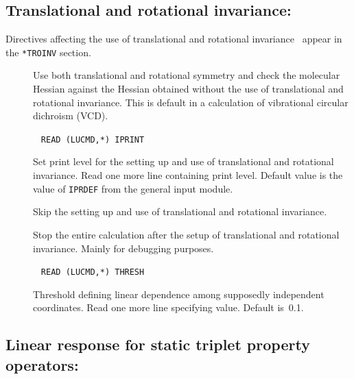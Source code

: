 \subsection{Translational and rotational invariance:
}\label{sec:abatro}

Directives affecting the use of translational and rotational
invariance~\cite{trarot}
appear in the \verb|*TROINV| section.
\begin{description}
\item[] Use both translational and
 rotational symmetry
 and check the molecular Hessian against the Hessian obtained
without the use of translational and rotational invariance. This is
default in a calculation of vibrational circular dichroism
(VCD).

\item[]\verb| |\newline
\verb|READ (LUCMD,*) IPRINT|

Set print level for the setting up and use of translational and
rotational invariance.  Read one more line containing print
level. Default value is the value of \verb|IPRDEF| from the
general input module.

\item[] Skip the setting up and use of translational
and rotational invariance.

\item[] Stop the entire calculation after the setup of
translational and rotational invariance. Mainly for debugging purposes.

\item[]\verb| |\newline
\verb|READ (LUCMD,*) THRESH|

Threshold defining linear dependence among
supposedly independent coordinates.  Read one more line specifying
value.  Default is~0.1.
\end{description}

\subsection{Linear response for static triplet property operators:
}\label{sec:trprsp}

